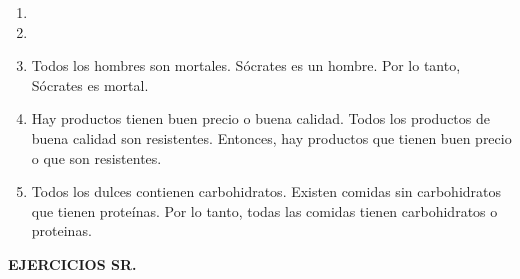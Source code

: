 \documentclass[a4paper]{article}
\newcommand{\then}{\to}
\begin{document}
\begin{enumerate}
\begin{multicols}{2}
\begin{enumerate} [label=(\alph*)]
		\item \Reasoning{$\neg \forall x: P(x) \then  Q(x)$}{$\exists x: P(x)$}
		\item {}
		\item Todos los hombres son mortales. Sócrates es un hombre. Por lo tanto, Sócrates es mortal.
		\item Hay productos tienen buen precio o buena calidad. Todos los productos de buena calidad son resistentes. Entonces, hay productos que tienen buen precio o que son resistentes. 
		\item Todos los dulces contienen carbohidratos. Existen comidas sin carbohidratos que tienen proteínas. Por lo tanto, todas las comidas tienen carbohidratos o proteinas.
	\end{enumerate}
	\end{multicols}
\end{enumerate}
\textbf{EJERCICIOS SR.}
\end{document}
